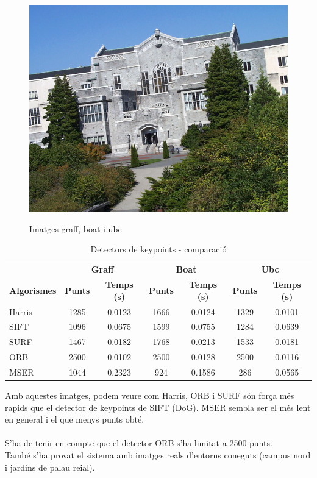 \begin{figure}[!htb]
				\includegraphics[width=\linewidth]{images/experiments/ubc}
				\label{fig:awesome_image3}
			\endminipage
			\caption{Imatges graff, boat i ubc}
		\end{figure}

		\begin{table}[H]
			\begin{center}
				\begin{tabular}{l | c c | c c | c c}
					& \multicolumn{2}{c|}{\textbf{Graff}} & \multicolumn{2}{c|}{\textbf{Boat}} & \multicolumn{2}{c}{\textbf{Ubc}} \\
					\textbf{Algorismes} & \textbf{Punts} & \textbf{Temps (s)} & \textbf{Punts} & \textbf{Temps (s)} & \textbf{Punts} & \textbf{Temps (s)} \\ \hline
					Harris & 1285 & 0.0123 & 1666 & 0.0124 & 1329 & 0.0101 \\
					SIFT & 1096 & 0.0675 & 1599 & 0.0755 & 1284 & 0.0639 \\
					SURF & 1467 & 0.0182 & 1768 & 0.0213 & 1533 & 0.0181 \\
					ORB & 2500 & 0.0102 & 2500 & 0.0128 & 2500 & 0.0116 \\
					MSER & 1044 & 0.2323 & 924 & 0.1586 & 286 & 0.0565 \\
				\end{tabular}
			\end{center}
			\caption{Detectors de keypoints - comparació}
		\end{table}
		\noindent
		Amb aquestes imatges, podem veure com Harris, ORB i SURF són força més rapids que el detector de keypoints de SIFT (DoG). MSER sembla ser el més lent en general i el que menys punts obté.\\\\
		S'ha de tenir en compte que el detector ORB s'ha limitat a 2500 punts.\\
\newpage
		\noindent
		També s'ha provat el sistema amb imatges reals d'entorns coneguts (campus nord i jardins de palau reial).

